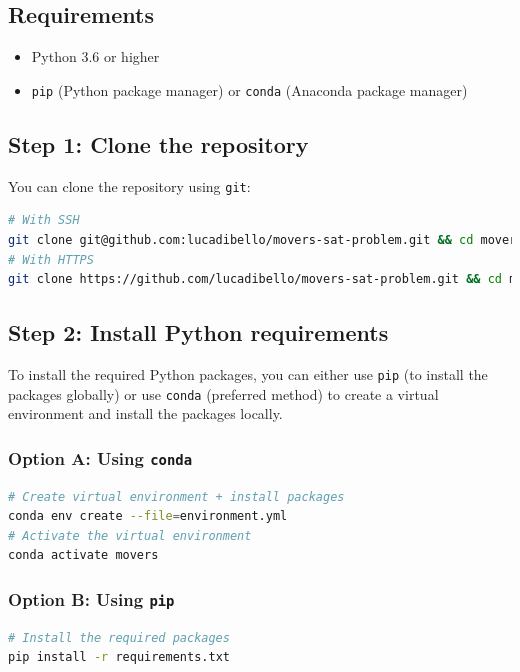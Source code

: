 \documentclass[a4paper, 11pt]{article}
\begin{document}
\subsection{Requirements}

\begin{itemize}
	\item Python 3.6 or higher
	\item \texttt{pip} (Python package manager) or \texttt{conda} (Anaconda package manager)
\end{itemize}

\subsection{Step 1: Clone the repository}

You can clone the repository using \texttt{git}:

\begin{lstlisting}[language=bash]
# With SSH
git clone git@github.com:lucadibello/movers-sat-problem.git && cd movers-sat-problem
# With HTTPS
git clone https://github.com/lucadibello/movers-sat-problem.git && cd movers-sat-problem
\end{lstlisting}

\subsection{Step 2: Install Python requirements}

To install the required Python packages, you can either use \texttt{pip} (to install the packages globally) or use \texttt{conda} (preferred method) to create a virtual environment and install the packages locally.

\subsubsection*{Option A: Using \texttt{conda}}

\begin{lstlisting}[language=bash]
# Create virtual environment + install packages
conda env create --file=environment.yml
# Activate the virtual environment
conda activate movers
\end{lstlisting}

\subsubsection*{Option B: Using \texttt{pip}}

\begin{lstlisting}[language=bash]
# Install the required packages
pip install -r requirements.txt
\end{lstlisting}
\end{document}
